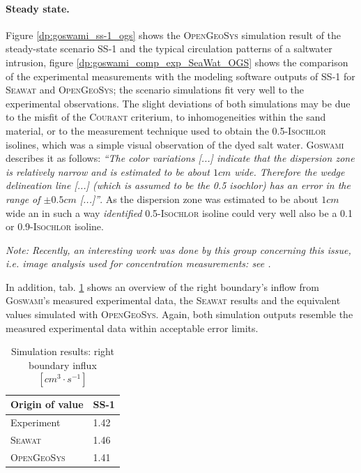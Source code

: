 \paragraph*{Steady state.} Figure \ref{dp:goswami_ss-1_ogs} shows the \textsc{OpenGeoSys} simulation result of the steady-state scenario SS-1 and the typical circulation patterns of a saltwater intrusion, figure \ref{dp:goswami_comp_exp_SeaWat_OGS} shows the comparison of the experimental measurements with the modeling software outputs of SS-1 for \textsc{Seawat} and \textsc{OpenGeoSys}; the scenario simulations fit very well to the experimental observations. The slight deviations of both simulations may be due to the misfit of the \textsc{Courant} criterium, to inhomogeneities within the sand material, or to the measurement technique used to obtain the 0.5-\textsc{Isochlor} isolines, which was a simple visual observation of the dyed salt water. \textsc{Goswami} describes it as follows: \textit{``The color variations [...] indicate that the dispersion zone is relatively narrow and is estimated to be about $1 cm$ wide. Therefore the wedge delineation line [...] (which is assumed to be the 0.5 isochlor) has an error in the range of $\pm 0.5 cm$ [...]''}. As the dispersion zone was estimated to be about $1 cm$ wide an in such a way \textit{identified} 0.5-\textsc{Isochlor} isoline could very well also be a 0.1 or 0.9-\textsc{Isochlor} isoline. 

\textit{Note: Recently, an interesting work was done by this group concerning this issue, i.e. image analysis used for concentration measurements: see \cite{gos:2009}.}


In addition, tab. \ref{dp:goswami_flow_results} shows an overview of the right boundary's inflow from \textsc{Goswami}'s measured experimental data, the \textsc{Seawat} results and the equivalent values simulated with \textsc{OpenGeoSys}. Again, both simulation outputs resemble the measured experimental data within acceptable error limits.

\begin{table}
 \centering 
 \caption{Simulation results: right boundary influx $[cm^3\cdot s^{-1}]$}
 \label{dp:goswami_flow_results}
 \begin{tabular}{ll}
 \toprule
 Origin of value & SS-1 \\ %
 \midrule
 Experiment & 1.42 \\ %
 \textsc{Seawat} & 1.46 \\ %
 \textsc{OpenGeoSys} & 1.41 \\ %
 \bottomrule
 \end{tabular}
\end{table}

